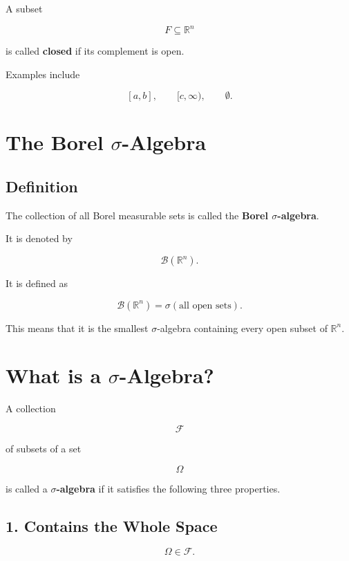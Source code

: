 \documentclass[11pt]{article}
\begin{document}
	A subset
	
	\[
	F\subseteq\mathbb R^n
	\]
	
	is called \textbf{closed} if its complement is open.
	
	Examples include
	
	\[
	[a,b],
	\qquad
	[c,\infty),
	\qquad
	\emptyset.
	\]
	
	
	\section{The Borel $\sigma$-Algebra}
	
	\subsection{Definition}
	
	The collection of all Borel measurable sets is called the
	\textbf{Borel $\sigma$-algebra}.
	
	It is denoted by
	
	\[
	\boxed{
		\mathcal B(\mathbb R^n).
	}
	\]
	
	It is defined as
	
	\[
	\boxed{
		\mathcal B(\mathbb R^n)
		=
		\sigma(\text{all open sets}).
	}
	\]
	
	This means that it is the smallest $\sigma$-algebra containing every open
	subset of $\mathbb R^n$.
	
	
	\section{What is a $\sigma$-Algebra?}
	
	A collection
	
	\[
	\mathcal F
	\]
	
	of subsets of a set
	
	\[
	\Omega
	\]
	
	is called a \textbf{$\sigma$-algebra} if it satisfies the following three
	properties.
	
	\subsection*{1. Contains the Whole Space}
	
	\[
	\boxed{
		\Omega\in\mathcal F.
	}
	\]
	
\end{document}
